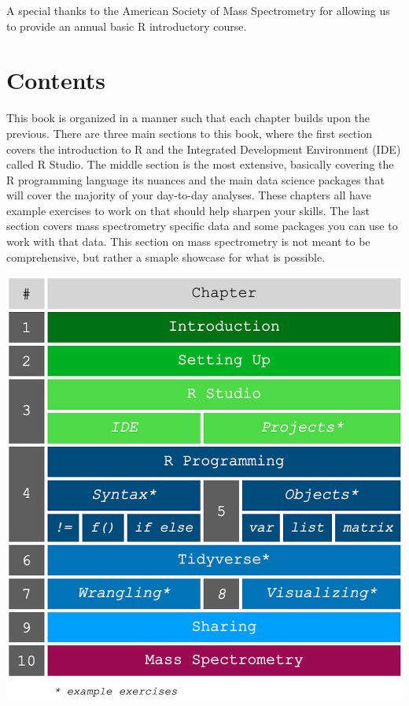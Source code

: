 \documentclass[
]{book}
\begin{document}
A special thanks to the American Society of Mass Spectrometry for allowing us to provide an annual basic R introductory course.

\hypertarget{contents}{%
\chapter*{Contents}\label{contents}}

This book is organized in a manner such that each chapter builds upon the previous. There are three main sections to this book, where the first section covers the introduction to R and the Integrated Development Environment (IDE) called R Studio. The middle section is the most extensive, basically covering the R programming language its nuances and the main data science packages that will cover the majority of your day-to-day analyses. These chapters all have example exercises to work on that should help sharpen your skills. The last section covers mass spectrometry specific data and some packages you can use to work with that data. This section on mass spectrometry is not meant to be comprehensive, but rather a smaple showcase for what is possible.

\begin{center}\includegraphics[width=15in]{images/01_000_book_contents} \end{center}
\end{document}
